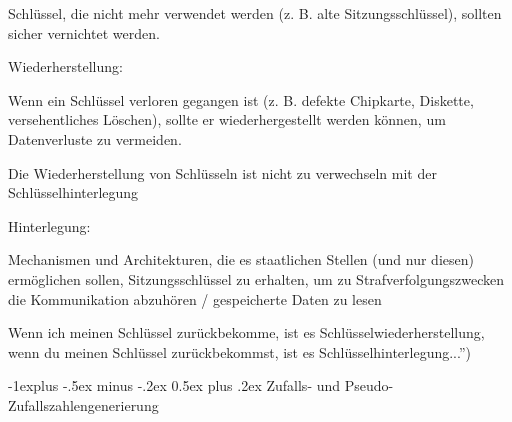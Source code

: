 \documentclass[a4paper]{article}
\makeatletter
\renewcommand{\subsection}{\@startsection{subsection}{2}{0mm}%
 {-1explus -.5ex minus -.2ex}%
 {0.5ex plus .2ex}%
 {\normalfont\normalsize\bfseries}}
\makeatother
\begin{document}
\begin{multicols}{3}
\begin{itemize*}
            \begin{itemize*}
                  \item Schlüssel, die nicht mehr verwendet werden (z. B. alte Sitzungsschlüssel), sollten sicher vernichtet werden.
            \end{itemize*}
            \item Wiederherstellung:
            \begin{itemize*}
                  \item Wenn ein Schlüssel verloren gegangen ist (z. B. defekte Chipkarte, Diskette, versehentliches Löschen), sollte er wiederhergestellt werden können, um Datenverluste zu vermeiden.
                  \item Die Wiederherstellung von Schlüsseln ist nicht zu verwechseln mit der Schlüsselhinterlegung
            \end{itemize*}
            \item Hinterlegung:
            \begin{itemize*}
                  \item Mechanismen und Architekturen, die es staatlichen Stellen (und nur diesen) ermöglichen sollen, Sitzungsschlüssel zu erhalten, um zu Strafverfolgungszwecken die Kommunikation abzuhören / gespeicherte Daten zu lesen
                  \begin{itemize*} \item Wenn ich meinen Schlüssel zurückbekomme, ist es Schlüsselwiederherstellung, wenn du meinen Schlüssel zurückbekommst, ist es Schlüsselhinterlegung...'') \end{itemize*}
            \end{itemize*}
      \end{itemize*}


      \subsection{Zufalls- und
            Pseudo-Zufallszahlengenerierung}


\end{multicols}
\end{document}
